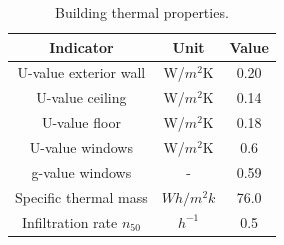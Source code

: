 \documentclass[twocolumn, a4paper,10pt]{article}
\begin{document}
\begin{table}[ht]
\vspace{-5pt}   %
\caption{Building thermal properties.}
\label{tab:properties}
\centering
\begin{tabular}{| c | c | c | }
  \hline
  \bf{Indicator} & \bf{Unit} & \bf{Value} \\
  \hline
  U-value exterior wall & W/$m^2$K & 0.20 \\
  U-value ceiling & W/$m^2$K & 0.14 \\
  U-value floor & W/$m^2$K & 0.18 \\
  U-value windows & W/$m^2$K & 0.6 \\
  g-value windows & - & 0.59 \\  
  Specific thermal mass & $Wh/m^{2}k$ & 76.0 \\
  Infiltration rate $n_{50}$ & $h^{-1}$ & 0.5 \\
  \hline
\end{tabular}
\vspace{-5pt}   %
\end{table}

\end{document}
